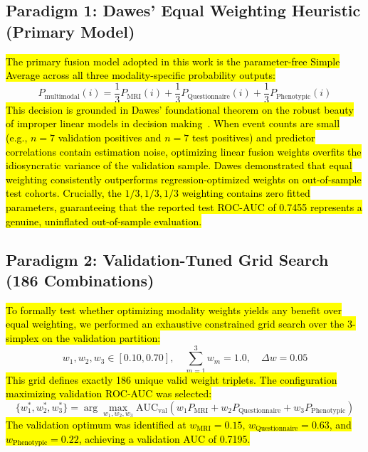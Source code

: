 \documentclass[10pt,letterpaper]{article}
\begin{document}
        \subsection*{Paradigm 1: Dawes' Equal Weighting Heuristic (Primary Model)}
        \hl{The primary fusion model adopted in this work is the parameter-free Simple Average across all three modality-specific probability outputs:}
        \begin{equation} \label{eq:simple_average}
        P_{\text{multimodal}}(i) = \frac{1}{3} P_{\text{MRI}}(i) + \frac{1}{3} P_{\text{Questionnaire}}(i) + \frac{1}{3} P_{\text{Phenotypic}}(i)
        \end{equation}
        \hl{This decision is grounded in Dawes' foundational theorem on the robust beauty of improper linear models in decision making~\cite{ref_dawes}. When event counts are small (e.g., $n=7$ validation positives and $n=7$ test positives) and predictor correlations contain estimation noise, optimizing linear fusion weights overfits the idiosyncratic variance of the validation sample. Dawes demonstrated that equal weighting consistently outperforms regression-optimized weights on out-of-sample test cohorts. Crucially, the $1/3, 1/3, 1/3$ weighting contains zero fitted parameters, guaranteeing that the reported test ROC-AUC of 0.7455 represents a genuine, uninflated out-of-sample evaluation.}

        \subsection*{Paradigm 2: Validation-Tuned Grid Search (186 Combinations)}
        \hl{To formally test whether optimizing modality weights yields any benefit over equal weighting, we performed an exhaustive constrained grid search over the 3-simplex on the validation partition:}
        \begin{equation} \label{eq:grid_weights}
        w_1, w_2, w_3 \in [0.10, 0.70],\quad \sum_{m=1}^3 w_m = 1.0,\quad \Delta w = 0.05
        \end{equation}
        \hl{This grid defines exactly 186 unique valid weight triplets. The configuration maximizing validation ROC-AUC was selected:}
        \begin{equation} \label{eq:grid_opt}
        \{w_1^*, w_2^*, w_3^*\} = \arg\max_{w_1, w_2, w_3} \text{AUC}_{\text{val}}(w_1 P_{\text{MRI}} + w_2 P_{\text{Questionnaire}} + w_3 P_{\text{Phenotypic}})
        \end{equation}
        \hl{The validation optimum was identified at $w_{\text{MRI}} = 0.15$, $w_{\text{Questionnaire}} = 0.63$, and $w_{\text{Phenotypic}} = 0.22$, achieving a validation AUC of 0.7195.}
\end{document}
